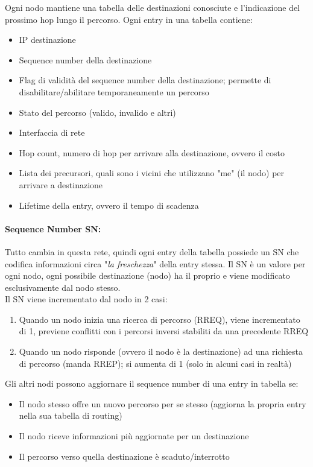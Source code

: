 Ogni nodo mantiene una tabella delle destinazioni conosciute e l'indicazione del prossimo hop lungo il percorso. Ogni entry in una tabella contiene:
\begin{itemize}
	\item IP destinazione
	\item Sequence number della destinazione
	\item Flag di validità del sequence number della destinazione; permette di disabilitare/abilitare temporaneamente un percorso
	\item Stato del percorso (valido, invalido e altri)
	\item Interfaccia di rete
	\item Hop count, numero di hop per arrivare alla destinazione, ovvero il costo
	\item Lista dei precursori, quali sono i vicini che utilizzano "me" (il nodo) per arrivare a destinazione
	\item Lifetime della entry, ovvero il tempo di scadenza
\end{itemize}

\paragraph{Sequence Number SN:} Tutto cambia in questa rete, quindi ogni entry della tabella possiede un SN che codifica informazioni circa "\textit{la freschezza}" della entry stessa. Il SN è un valore per ogni nodo, ogni possibile destinazione (nodo) ha il proprio e viene modificato esclusivamente dal nodo stesso. \\

Il SN viene incrementato dal nodo in 2 casi: 
\begin{enumerate}
	\item Quando un nodo inizia una ricerca di percorso (RREQ), viene incrementato di 1, previene conflitti con i percorsi inversi stabiliti da una precedente RREQ
	\item Quando un nodo risponde (ovvero il nodo è la destinazione) ad una richiesta di percorso (manda RREP); si aumenta di 1 (solo in alcuni casi in realtà)
\end{enumerate}

Gli altri nodi possono aggiornare il sequence number di una entry in tabella se: 
\begin{itemize}
	\item Il nodo stesso offre un nuovo percorso per se stesso (aggiorna la propria entry nella sua tabella di routing)
	\item Il nodo riceve informazioni più aggiornate per un destinazione
	\item Il percorso verso quella destinazione è scaduto/interrotto
\end{itemize}

